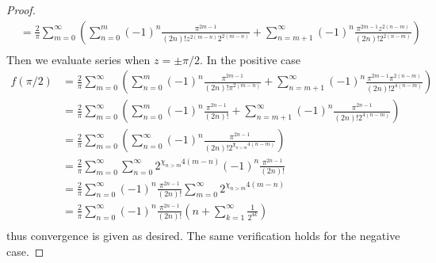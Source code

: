 \documentclass[11pt]{amsart}
\theoremstyle{definition}
\numberwithin{theorem}{section}
\numberwithin{definition}{section}
\numberwithin{equation}{section}
\begin{document}
\begin{proof}
\begin{equation*}
\begin{aligned}
		&=\frac{2}{\pi} \sum_{m=0}^\infty  \left(\sum_{n=0}^m  (-1)^n \frac{\pi^{2m-1}}{(2n)!z^{2(m- n)} 2^{2(m-n)}} + \sum_{n=m+1}^\infty  (-1)^n \frac{\pi^{2m-1}z^{2(n-m)} }{(2n)!2^{2(n-m)}} \right) \\
		\end{aligned}
	\end{equation*}
	Then we evaluate series when $z = \pm\pi/2.$ In the positive case
	\begin{equation*}
		\begin{aligned}
			f(\pi/2) &= \frac{2}{\pi} \sum_{m=0}^\infty  \left(\sum_{n=0}^m  (-1)^n \frac{\pi^{2m-1}}{(2n)!\pi^{2(m- n)}} + \sum_{n=m+1}^\infty  (-1)^n \frac{\pi^{2m-1}\pi^{2(n-m)} }{(2n)!2^{4(n-m)}} \right) \\
			 &= \frac{2}{\pi} \sum_{m=0}^\infty  \left(\sum_{n=0}^m  (-1)^n \frac{\pi^{2n-1}}{(2n)!} + \sum_{n=m+1}^\infty  (-1)^n \frac{\pi^{2n -1} }{(2n)!2^{4(n-m)}} \right) \\
			 &= \frac{2}{\pi} \sum_{m=0}^\infty  \left(\sum_{n=0}^\infty  (-1)^n \frac{\pi^{2n-1}}{(2n)!2^{\chi_{n>m}4(n-m)}}  \right) \\
			 &= \frac{2}{\pi} \sum_{m=0}^\infty \sum_{n=0}^\infty 2^{\chi_{n>m}4(m-n)}  (-1)^n \frac{\pi^{2n-1}}{(2n)!}  \\
			 &= \frac{2}{\pi} \sum_{n=0}^\infty  (-1)^n \frac{\pi^{2n-1}}{(2n)!}
			 \sum_{m=0}^\infty 2^{\chi_{n>m}4(m-n) } \\
			 &= \frac{2}{\pi} \sum_{n=0}^\infty  (-1)^n \frac{\pi^{2n-1}}{(2n)!} \left(n + \sum_{k=1}^\infty \frac{1}{2^{4k}}\right)  \\
		\end{aligned}
	\end{equation*}
	thus convergence is given as desired. The same verification holds for the negative case.
	
\end{proof}
\end{document}
